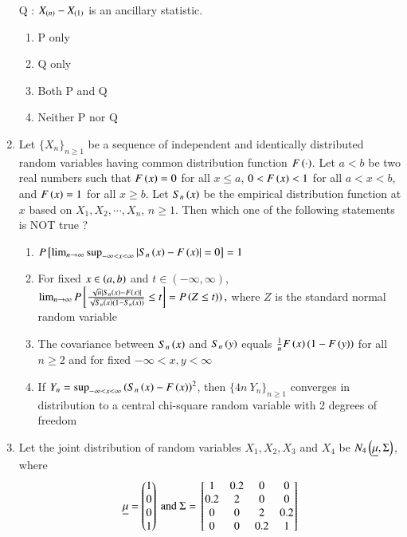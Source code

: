 \documentclass[journal]{IEEEtran}
\begin{document}
\begin{enumerate}
Q : $X_{\left(n\right)} - X_{\left(1\right)}$ is an ancillary statistic.
\begin{enumerate}
    \item P only
    \item Q only
    \item Both P and Q
    \item Neither P nor Q \\ 
\end{enumerate}
\item Let $\{X_n\}_{n \geq 1}$ be a sequence of independent and identically distributed random variables having common distribution function $ F\left(\cdot\right)$. Let $a < b$ be two real numbers such that $F\left(x\right) = 0$ for all $x \leq a$, $0 < F\left(x\right) < 1$ for all $a < x < b$, and $F\left(x\right) = 1$ for all $x \geq b$. Let $S_n\left(x\right)$ be the empirical distribution function at $x$ based on $X_1, X_2, \cdots, X_n$, $n \geq 1$. Then which one of the following statements is NOT true ?
\begin{enumerate}
    \item $P{}\left[\lim_{n \rightarrow \infty} \sup_{-\infty < x < \infty} \left\vert S_n\left(x\right) - F\left(x\right)\right\vert = 0\right] = 1$
    \item For fixed $x \in \left(a, b\right)$ and $t \in (-\infty, \infty)$,
    $\lim_{n \to \infty} P{}\left[\frac{\sqrt{n}\left\vert S_n\left(x\right) - F\left(x\right)\right\vert}{\sqrt{S_n\left(x\right)(1 - S_n\left(x\right))}} \leq t\right] = P\left(Z \leq t)\right),$
    where $Z$ is the standard normal random variable
    \item The covariance between $S_n\left(x\right)$ and $S_n\left(y\right)$ equals $\frac{1}{n} F\left(x\right)(1 - F\left(y\right))$ for all $n \geq 2$ and for fixed $-\infty < x, y < \infty$
    \item If $Y_n = \sup_{-\infty < x < \infty} \left(S_n\left(x\right) - F\left(x\right)\right)^2$, then $\{4n\ Y_n\}_{n \geq 1}$ converges in distribution to a central chi-square random variable with 2 degrees of freedom \\
\end{enumerate}
\item Let the joint distribution of random variables $X_1, X_2, X_3$ and $X_4$ be $N_4\left(\underline{\mu}, \Sigma\right)$, where
\begin{align*}
\underline{\mu} = \begin{pmatrix}1 \\ 0 \\ 0 \\ 1\end{pmatrix}\ \text{and}\ \Sigma = {}\left[\begin{matrix}
    1 & 0.2 & 0 & 0 \\ 0.2 & 2 & 0 & 0 \\ 0 & 0 & 2 & 0.2 \\ 0 & 0 & 0.2 & 1

\end{matrix}\right]
\end{align*}
\end{enumerate}
\end{document}
